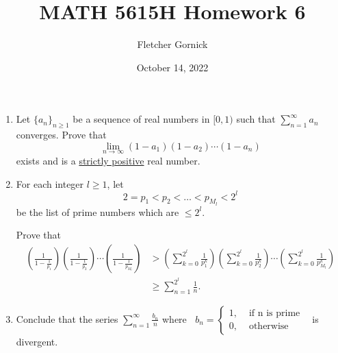 \documentclass[11pt]{article}
\title{\vspace{-1.0cm}MATH 5615H Homework 6}
\author{Fletcher Gornick}
\date{October 14, 2022}
\begin{document}
 \maketitle
 \begin{enumerate}[label=(\roman*)]
   \item Let \(\{a_n\}_{n \geq 1}\) be a sequence of real numbers in \([0, 1)\) such that 
     \(\displaystyle\sum_{n=1}^{\infty} a_n\) converges.  Prove that
     \[\lim_{n \to \infty} (1 - a_1)(1 - a_2) \cdots (1 - a_n)\]
     exists and is a \underline{strictly positive} real number.

   \item For each integer \(l \geq 1\), let 
     \[2 = p_1 < p_2 < \hdots < p_{M_l} < 2^l\]
     be the list of prime numbers which are \(\leq 2^l\).

     Prove that
       \begin{align*}
         \left(\frac{1}{1 - \frac{1}{p_1}}\right) \left(\frac{1}{1 - \frac{1}{p_2}}\right) \cdots 
         \left(\frac{1}{1 - \frac{1}{p_{M_l}}}\right)
         & > \left(\sum_{k=0}^{2^l} \frac{1}{p_1^k}\right) \left(\sum_{k=0}^{2^l} \frac{1}{p_2^k}\right)
         \cdots \left(\sum_{k=0}^{2^l} \frac{1}{p_{M_l}^k}\right) \\
         & \geq \sum_{n=1}^{2^l} \frac{1}{n}.
       \end{align*}

       
     \item Conclude that the series \(\displaystyle\sum_{n=1}^{\infty}\frac{b_n}{n}\) where
       \(\;\;b_n = \begin{cases}
          1, &\text{ if n is prime} \\
           0, &\text{ otherwise}
         \end{cases}\;\;\) is divergent.
 \end{enumerate}
\end{document}
